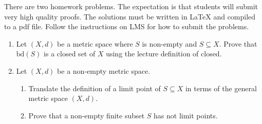 \documentclass{article}
\newcommand{\bd}{\text{bd}}
\begin{document}

\medskip

There are two homework problems. The expectation is that students
will submit very high quality proofs. The solutions must be written
in LaTeX and compiled to a pdf file. 
Follow the instructions on LMS for how to submit the problems.

\bigskip
\bigskip


\begin{enumerate}
\item Let $(X,d)$ be a metric space where $S$ is non-empty and $S \subseteq X.$  
Prove that $\bd(S)$ is a closed set of $X$ using the lecture definition of closed.


\item Let $(X,d)$ be a non-empty metric space.
\begin{enumerate}
\item Translate the definition of a limit point of $S \subseteq X$ in terms of the general metric space $(X,d)$.
\item Prove that a non-empty finite subset $S$ has not limit points.
\end{enumerate}
\end{enumerate}
\end{document}
